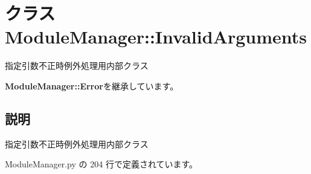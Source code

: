 \section{クラス ModuleManager::InvalidArguments}
\label{classsource__py_1_1_module_manager_1_1_module_manager_1_1_invalid_arguments}
指定引数不正時例外処理用内部クラス  


{\bf ModuleManager::Error}を継承しています。



\subsection{説明}
指定引数不正時例外処理用内部クラス 

 ModuleManager.py の 204 行で定義されています。